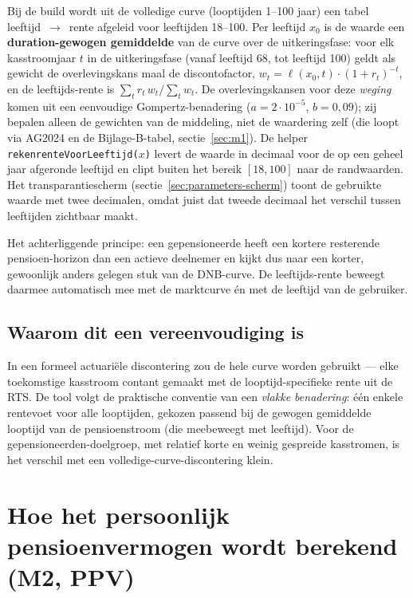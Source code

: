 \documentclass[11pt,a4paper]{article}
\newcommand{\code}[1]{\texttt{#1}}
\begin{document}
Bij de build wordt uit de volledige curve (looptijden 1--100 jaar) een tabel leeftijd~$\to$~rente afgeleid voor leeftijden 18--100. Per leeftijd $x_0$ is de waarde een \textbf{duration-gewogen gemiddelde} van de curve over de uitkeringsfase: voor elk kasstroomjaar $t$ in de uitkeringsfase (vanaf leeftijd 68, tot leeftijd 100) geldt als gewicht de overlevingskans maal de discontofactor, $w_t = \ell(x_0, t) \cdot (1 + r_t)^{-t}$, en de leeftijds-rente is $\sum_t r_t\,w_t / \sum_t w_t$. De overlevingskansen voor deze \emph{weging} komen uit een eenvoudige Gompertz-benadering ($a = 2 \cdot 10^{-5}$, $b = 0{,}09$); zij bepalen alleen de gewichten van de middeling, niet de waardering zelf (die loopt via AG2024 en de Bijlage-B-tabel, sectie~\ref{sec:m1}). De helper \code{rekenrenteVoorLeeftijd($x$)} levert de waarde in decimaal voor de op een geheel jaar afgeronde leeftijd en clipt buiten het bereik $[18, 100]$ naar de randwaarden. Het transparantiescherm (sectie~\ref{sec:parameters-scherm}) toont de gebruikte waarde met twee decimalen, omdat juist dat tweede decimaal het verschil tussen leeftijden zichtbaar maakt.

Het achterliggende principe: een gepensioneerde heeft een kortere resterende pensioen-horizon dan een actieve deelnemer en kijkt dus naar een korter, gewoonlijk anders gelegen stuk van de DNB-curve. De leeftijds-rente beweegt daarmee automatisch mee met de marktcurve én met de leeftijd van de gebruiker.

\subsection{Waarom dit een vereenvoudiging is}

In een formeel actuariële discontering zou de hele curve worden gebruikt --- elke toekomstige kasstroom contant gemaakt met de looptijd-specifieke rente uit de RTS. De tool volgt de praktische conventie van een \emph{vlakke benadering}: één enkele rentevoet voor alle looptijden, gekozen passend bij de gewogen gemiddelde looptijd van de pensioenstroom (die meebeweegt met leeftijd). Voor de gepensioneerden-doelgroep, met relatief korte en weinig gespreide kasstromen, is het verschil met een volledige-curve-discontering klein.

\section{Hoe het persoonlijk pensioenvermogen wordt berekend (M2, PPV)}
\label{sec:m2}
\end{document}
